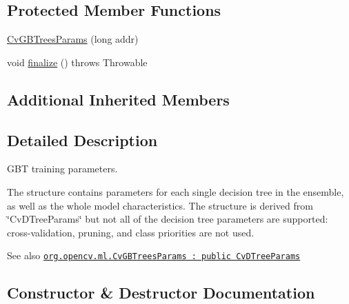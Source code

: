 \subsection*{Protected Member Functions}
\begin{DoxyCompactItemize}
\item 
\mbox{\hyperlink{classorg_1_1opencv_1_1ml_1_1_cv_g_b_trees_params_ab0efc5fc555e680406a9cd06a528e4ab}{Cv\+G\+B\+Trees\+Params}} (long addr)
\item 
void \mbox{\hyperlink{classorg_1_1opencv_1_1ml_1_1_cv_g_b_trees_params_acc8c49e3e09e85e0e626a6c3906bafed}{finalize}} ()  throws Throwable 
\end{DoxyCompactItemize}
\subsection*{Additional Inherited Members}


\subsection{Detailed Description}
G\+BT training parameters.

The structure contains parameters for each single decision tree in the ensemble, as well as the whole model characteristics. The structure is derived from \char`\"{}\+Cv\+D\+Tree\+Params\char`\"{} but not all of the decision tree parameters are supported\+: cross-\/validation, pruning, and class priorities are not used.

\begin{DoxySeeAlso}{See also}
\href{http://docs.opencv.org/modules/ml/doc/gradient_boosted_trees.html#cvgbtreesparams}{\tt org.\+opencv.\+ml.\+Cv\+G\+B\+Trees\+Params \+: public Cv\+D\+Tree\+Params} 
\end{DoxySeeAlso}


\subsection{Constructor \& Destructor Documentation}
\mbox{\label{classorg_1_1opencv_1_1ml_1_1_cv_g_b_trees_params_ab0efc5fc555e680406a9cd06a528e4ab}} 
